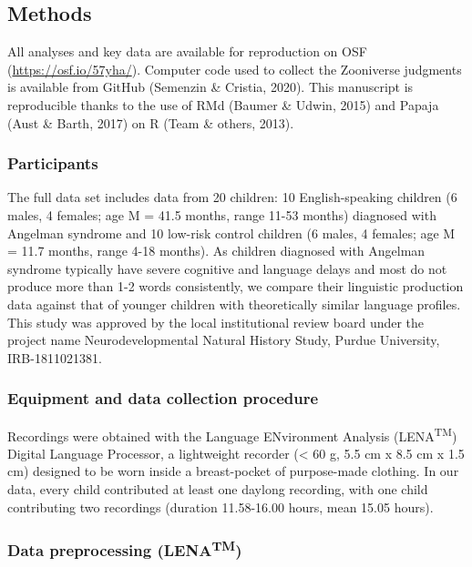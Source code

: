 \documentclass[english,,man]{apa6}
\begin{document}
\hypertarget{methods}{%
\subsection{Methods}\label{methods}}

All analyses and key data are available for reproduction on OSF (\url{https://osf.io/57yha/}). Computer code used to collect the Zooniverse judgments is available from GitHub (Semenzin \& Cristia, 2020). This manuscript is reproducible thanks to the use of RMd (Baumer \& Udwin, 2015) and Papaja (Aust \& Barth, 2017) on R (Team \& others, 2013).

\hypertarget{participants}{%
\subsubsection{Participants}\label{participants}}

The full data set includes data from 20 children: 10 English-speaking children (6 males, 4 females; age M = 41.5 months, range 11-53 months) diagnosed with Angelman syndrome and 10 low-risk control children (6 males, 4 females; age M = 11.7 months, range 4-18 months). As children diagnosed with Angelman syndrome typically have severe cognitive and language delays and most do not produce more than 1-2 words consistently, we compare their linguistic production data against that of younger children with theoretically similar language profiles. This study was approved by the local institutional review board under the project name Neurodevelopmental Natural History Study, Purdue University, IRB-1811021381.

\hypertarget{equipment-and-data-collection-procedure}{%
\subsubsection{Equipment and data collection procedure}\label{equipment-and-data-collection-procedure}}

Recordings were obtained with the Language ENvironment Analysis (LENA\textsuperscript{TM}) Digital Language Processor, a lightweight recorder (\textless{} 60 g, 5.5 cm x 8.5 cm x 1.5 cm) designed to be worn inside a breast-pocket of purpose-made clothing. In our data, every child contributed at least one daylong recording, with one child contributing two recordings (duration 11.58-16.00 hours, mean 15.05 hours).

\hypertarget{data-preprocessing-lenatm}{%
\subsubsection{\texorpdfstring{Data preprocessing (LENA\textsuperscript{TM})}{Data preprocessing (LENATM)}}\label{data-preprocessing-lenatm}}
\end{document}
